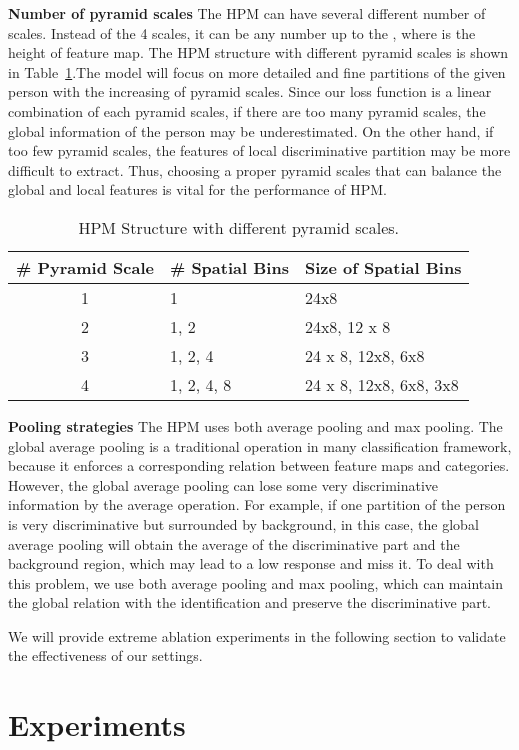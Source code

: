 \documentclass[letterpaper]{article} \usepackage{aaai19}  \usepackage{times}  \usepackage{helvet}  \usepackage{courier}  \usepackage{url}  \usepackage{graphicx}  \frenchspacing  \setlength{\pdfpagewidth}{8.5in}  \setlength{\pdfpageheight}{11in}  \usepackage{multirow}
\begin{document}
{\bf Number of pyramid scales}
The HPM can have several different number of scales. Instead of the 4 scales, it can be any number up to the , where  is the height of feature map. The HPM structure with different pyramid scales is shown in Table~\ref{method:t1}.The model will focus on more detailed and fine partitions of the given person with the increasing of pyramid scales. Since our loss function is a linear combination of each pyramid scales, if there are too many pyramid scales, the global information of the person may be underestimated. On the other hand, if too few pyramid scales, the features of local discriminative partition may be more difficult to extract. Thus, choosing a proper pyramid scales that can balance the global and local features is vital for the performance of HPM. 
\begin{table}[ht]\setlength{\tabcolsep}{5pt}
\centering
\begin{tabular}{c|l|l}
\hline
\# Pyramid Scale & \# Spatial Bins & Size of Spatial Bins \\ \hline
1 & 1 & 24x8\\ 
2 & 1, 2 & 24x8, 12 x 8\\
3 & 1, 2, 4 & 24 x 8, 12x8, 6x8 \\
4 & 1, 2, 4, 8 & 24 x 8, 12x8, 6x8, 3x8 \\
\hline
\end{tabular}
\caption{HPM Structure with different pyramid scales.}
\label{method:t1}
\end{table}

{\bf Pooling strategies}
The HPM uses both average pooling and max pooling. The global average pooling is a traditional operation in many classification framework, because it enforces a corresponding relation between feature maps and categories. However, the global average pooling can lose some very discriminative information by the average operation. For example, if one partition of the person is very discriminative but surrounded by background, in this case, the global average pooling will obtain the average of the discriminative part and the background region, which may lead to a low response and miss it. To deal with this problem, we use both average pooling and max pooling, which can maintain the global relation with the identification and preserve the discriminative part.

We will provide extreme ablation experiments in the following section to validate the effectiveness of our settings. \section{Experiments}
\end{document}
